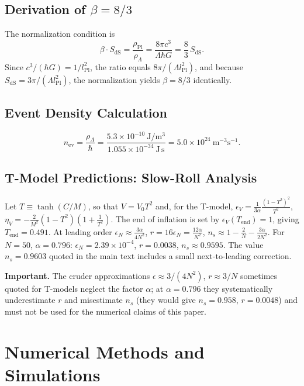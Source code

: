 \documentclass[11pt,a4paper]{article}
\begin{document}
\subsection{Derivation of $\beta=8/3$}\label{app:beta}
The normalization condition is
\begin{equation}
\beta\cdot S_{\mathrm{dS}}
=\frac{\rho_{\mathrm{Pl}}}{\rho_{\Lambda}}
=\frac{8\pi c^{3}}{\Lambda\hbar G}
=\frac{8}{3}\, S_{\mathrm{dS}}.
\end{equation}
Since $c^{3}/(\hbar G)=1/l_{\mathrm{Pl}}^{2}$, the ratio equals
$8\pi/(\Lambda l_{\mathrm{Pl}}^{2})$, and because
$S_{\mathrm{dS}}=3\pi/(\Lambda l_{\mathrm{Pl}}^{2})$, the
normalization yields $\beta=8/3$ identically.

\subsection{Event Density Calculation}\label{app:nev}
\begin{equation}
n_{\mathrm{ev}}=\frac{\rho_{\Lambda}}{\hbar}
=\frac{5.3\times10^{-10}\ \mathrm{J/m^{3}}}
 {1.055\times10^{-34}\ \mathrm{J\,s}}
=5.0\times10^{24}\ \mathrm{m^{-3}s^{-1}}.
\end{equation}

\subsection{T-Model Predictions: Slow-Roll Analysis}\label{app:slowroll}
Let $T\equiv\tanh(C/M)$, so that $V=V_{0}T^{2}$ and, for the
T-model,
$\epsilon_{V}=\frac{1}{3\alpha}\frac{(1-T^{2})^{2}}{T^{2}}$,
$\eta_{V}=-\frac{2}{M^{2}}(1-T^{2})\left(1+\frac{1}{T^{2}}\right)$.
The end of inflation is set by $\epsilon_{V}(T_{\mathrm{end}})=1$,
giving $T_{\mathrm{end}}=0.491$. At leading order
$\epsilon_{N}\approx\frac{3\alpha}{4N^{2}}$,
$r=16\epsilon_{N}=\frac{12\alpha}{N^{2}}$,
$n_{s}\approx1-\frac{2}{N}-\frac{3\alpha}{2N^{2}}$. For $N=50$,
$\alpha=0.796$: $\epsilon_{N}=2.39\times10^{-4}$, $r=0.0038$,
$n_{s}\approx0.9595$. The value $n_{s}=0.9603$ quoted in the main
text includes a small next-to-leading correction.

\textbf{Important.} The cruder approximations $\epsilon\approx
3/(4N^{2})$, $r\approx3/N$ sometimes quoted for T-models neglect
the factor $\alpha$; at $\alpha=0.796$ they systematically
underestimate $r$ and misestimate $n_{s}$ (they would give
$n_{s}=0.958$, $r=0.0048$) and must not be used for the numerical
claims of this paper.

\section{Numerical Methods and Simulations}
\end{document}
